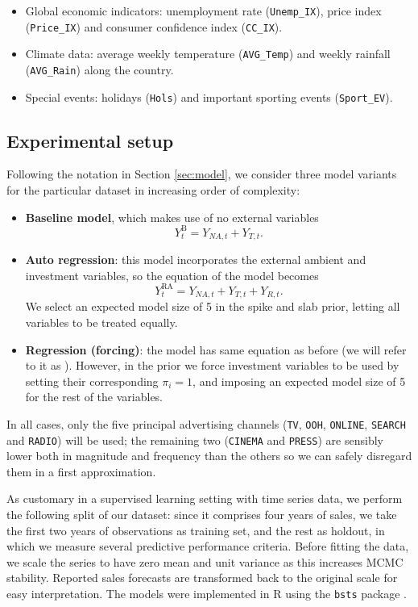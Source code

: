 \begin{itemize}
\item Global economic indicators: unemployment rate (\texttt{Unemp\_IX}), price index (\texttt{Price\_IX}) and consumer confidence index (\texttt{CC\_IX}).
\item Climate data: average weekly temperature (\texttt{AVG\_Temp}) and weekly rainfall (\texttt{AVG\_Rain}) along the country.
\item Special events: holidays (\texttt{Hols}) and important sporting events (\texttt{Sport\_EV}).
\end{itemize}

\subsection{Experimental setup}

Following the notation in Section \ref{sec:model}, we consider three model variants for the particular dataset in increasing order of complexity:


\begin{itemize}
\item \textbf{Baseline model}, which makes use of no external variables $$Y^{\text{B}}_t = Y_{NA,t} + Y_{T, t}.$$
\item \textbf{Auto regression}: this model  incorporates the external ambient and investment variables, so the equation of the model becomes 
$$ Y_t^{\text{RA}} = Y_{NA,t} + Y_{T, t} + Y_{R,t}.$$ We select an expected model size of 5 in the spike and slab prior, letting all variables to be treated equally.
\item \textbf{Regression (forcing)}: the model has same equation as before (we will refer to it as ).
However, in the prior we force investment variables to be used by setting their corresponding $\pi_i = 1$, and imposing an expected model size of 5 for the rest of the variables.
\end{itemize}
In all cases, only the five principal advertising channels (\texttt{TV}, \texttt{OOH}, \texttt{ONLINE}, \texttt{SEARCH} and \texttt{RADIO}) will be used; the remaining two (\texttt{CINEMA} and \texttt{PRESS}) are sensibly lower both in magnitude and frequency than the others so we can safely disregard them in a first approximation. 


As customary in a supervised learning setting with time series data, we perform the following split of our dataset: since it comprises four years of sales, we take the first two years of observations as training set, and the rest as holdout, in which we measure several predictive performance criteria. Before fitting the data, we scale the series to have zero mean and unit variance as this increases MCMC stability. Reported sales forecasts are transformed back to the original scale for easy interpretation. The models were implemented in R  using the \texttt{bsts} package \cite{scott2016bsts}.

